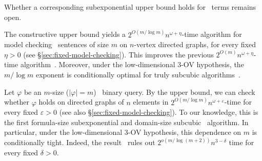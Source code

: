 Whether a corresponding subexponential upper bound holds for \CoR\ terms remains open.

\smallskip
{}
The constructive upper bound yields a
$2^{O(m/\log m)}n^{\omega+\eta}$-time algorithm for model checking \FOthree\ sentences of size $m$ on $n$-vertex directed graphs, for every fixed $\eta>0$ (see \S\ref{sec:fixed-model-checking}).
%
This improves the previous $2^{O(m)}n^{\omega+\eta}$-time algorithm~\citep[Theorem~10]{nakamura-uezato2027}.
%
Moreover, under the low-dimensional 3-OV hypothesis, the $m/\log m$ exponent is conditionally optimal for truly subcubic algorithms~\citep[Theorem~72]{nakamura-uezato2027}.

Let $\varphi$ be an $m$-size ($|\varphi| = m$) \FOthree\ binary query.
By the upper bound,
we can check whether $\varphi$ holds on directed graphs of $n$ elements in
$2^{O(m/\log m)}n^{\omega+\varepsilon}$-time
for every fixed $\varepsilon>0$
(see also \S\ref{sec:fixed-model-checking}).
To our knowledge, this is the first formula-size subexponential and domain-size subcubic \FOthree\ algorithm.
In particular, under the low-dimensional 3-OV hypothesis, this dependence on $m$ is conditionally tight.
Indeed, the result~\citep[Theorem~72]{nakamura-uezato2027} rules out $2^{o(m/\log(m+2))}n^{3-\delta}$ time for every fixed
$\delta>0$.
\fi
